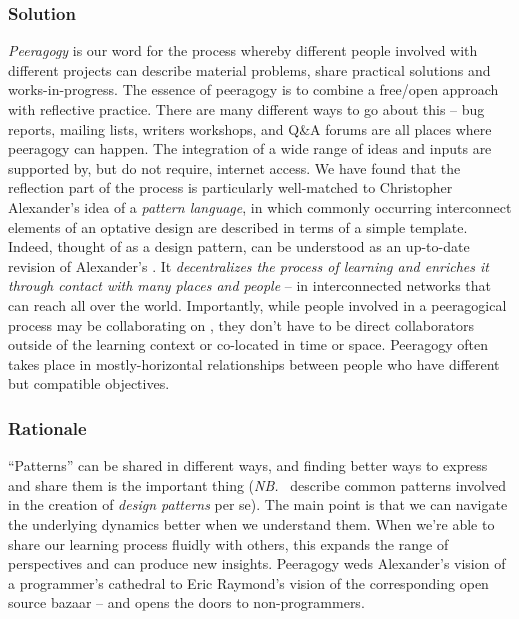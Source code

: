 \subsubsection*{Solution} \emph{Peeragogy} is our word for the process whereby different people involved with different projects can describe material problems, share practical solutions and works-in-progress.  The essence of peeragogy is to combine a free/open approach with reflective practice.  There are many different ways to go about this -- bug reports, mailing lists, writers workshops, and Q\&A forums are all places where peeragogy can happen.  The integration of a wide range of ideas and inputs are supported by, but do not require, internet access.  We have found that the reflection part of the process is particularly well-matched to Christopher Alexander's idea of a \emph{pattern language}, in which commonly occurring  interconnect elements of an optative design are described in terms of a simple template.  Indeed, thought of as a design pattern,  can be understood as an up-to-date revision of Alexander's  \cite[p. 99]{alexander1977pattern}.  It \emph{decentralizes the process of learning and enriches it through contact with many places and people} -- in interconnected networks that can reach all over the world.   Importantly, while people involved in a peeragogical process may be collaborating on , they don't have to be direct collaborators outside of the learning context or co-located in time or space.  Peeragogy often takes place in mostly-horizontal relationships between people who have different but compatible objectives.  

\subsubsection*{Rationale}
``Patterns'' can be shared in different ways, and finding better ways to express and share them is the important thing (\emph{NB.}~\cite{meszaros1998pattern} describe common patterns involved in the creation of \emph{design patterns} per se).  The main point is that we can navigate the underlying dynamics better when we understand them.  When we're able to share our learning process fluidly with others, this expands the range of perspectives and can produce new insights.  Peeragogy weds Alexander's vision of a programmer's cathedral to Eric Raymond's vision of the corresponding open source bazaar \cite{raymond2001cathedral} -- and opens the doors to non-programmers.

